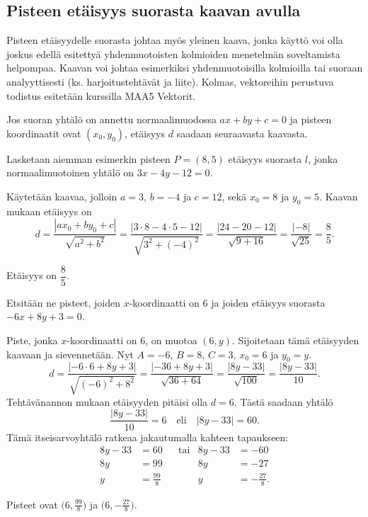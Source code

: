 \subsection*{Pisteen etäisyys suorasta kaavan avulla}

Pisteen etäisyydelle suorasta johtaa myös yleinen kaava, jonka käyttö voi olla joskus edellä esitettyä yhdenmuotoisten kolmioiden menetelmän soveltamista helpompaa. Kaavan voi johtaa esimerkiksi yhdenmuotoisilla kolmioilla tai suoraan analyyttisesti (ks. harjoitustehtävät ja liite). Kolmas, vektoreihin perustuva todistus esitetään kurssilla MAA5 Vektorit.

Jos suoran yhtälö on annettu normaalimuodossa $ax+by+c=0$ ja pisteen koordinaatit ovat $(x_0, y_0)$, etäisyys $d$ saadaan seuraavasta kaavasta.


\begin{esimerkki} Lasketaan aiemman esimerkin pisteen $P=(8, 5)$ etäisyys suorasta $l$, jonka normaalimuotoinen yhtälö on $3x-4y-12=0$.
\begin{esimratk}
Käytetään kaavaa, jolloin $a=3$, $b=-4$ ja $c=12$, sekä $x_0=8$ ja $y_0=5$. Kaavan mukaan etäisyys on
\[
d=\frac{|ax_0+by_0+c|}{\sqrt{a^2+b^2}}
=\frac{|3\cdot 8-4\cdot 5-12|}{\sqrt{3^2+(-4)^2}}
=\frac{|24-20-12|}{\sqrt{9+16}}=\frac{|-8|}{\sqrt{25}}
=\frac{8}{5}.
\]
\end{esimratk}
\begin{esimvast}
Etäisyys on $\dfrac{8}{5}$.
\end{esimvast}
\end{esimerkki}

\begin{esimerkki} Etsitään ne pisteet, joiden $x$-koordinaatti on 6 ja joiden etäisyys suorasta $-6x+8y+3=0$.
\begin{esimratk}
Piste, jonka $x$-koordinaatti on 6, on muotoa $(6, y)$. Sijoitetaan tämä etäisyyden kaavaan ja sievennetään.
Nyt $A=-6$, $B=8$, $C=3$, $x_0=6$ ja $y_0=y$.
\[
d=\frac{|-6\cdot 6+8y+3|}{\sqrt{(-6)^2+8^2}}
=\frac{|-36+8y+3|}{\sqrt{36+64}}
=\frac{|8y-33|}{\sqrt{100}}
=\frac{|8y-33|}{10}.
\]
Tehtävänannon mukaan etäisyyden pitäisi olla $d=6$. Tästä saadaan yhtälö
\[
\frac{|8y-33|}{10}=6 \quad \text{eli} \quad |8y-33|=60.
\]
Tämä itseisarvoyhtälö ratkeaa jakautumalla kahteen tapaukseen:
\begin{align*}
8y-33 & =60 & &\text{tai} & 8y-33 & =-60 \\
8y & =99 & & & 8y & =-27 \\
y & =\frac{99}{8} & & & y & =-\frac{27}{8}.
\end{align*}
\end{esimratk}
\begin{esimvast}
Pisteet ovat $\bigl(6, \frac{99}{8}\bigr)$ ja $\bigl(6, -\frac{27}{8}\bigr)$.
\end{esimvast}
\end{esimerkki}


